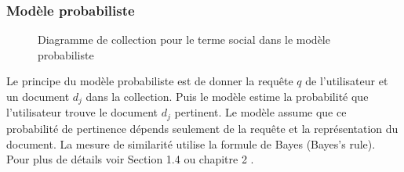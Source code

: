 \subsubsection{Modèle probabiliste}
\begin{figure}[htbp]
    \begin{center}
    \end{center}
    \caption{Diagramme de collection pour le terme social dans le modèle probabiliste \citep{model-ir}}
    \label{fig:probabilistic-model}
\end{figure}

Le principe du modèle probabiliste est de donner la requête $q$ de l'utilisateur et un document $d_{j}$ dans la collection. Puis le modèle estime la probabilité que l'utilisateur trouve le document $d_{j}$ pertinent. Le modèle assume que ce probabilité de pertinence dépends seulement de la requête et la représentation du document. La mesure de similarité utilise la formule de Bayes (Bayes's rule). Pour plus de détails voir Section 1.4 \citep{model-ir} ou chapitre 2 \citep{modern-ir}.

